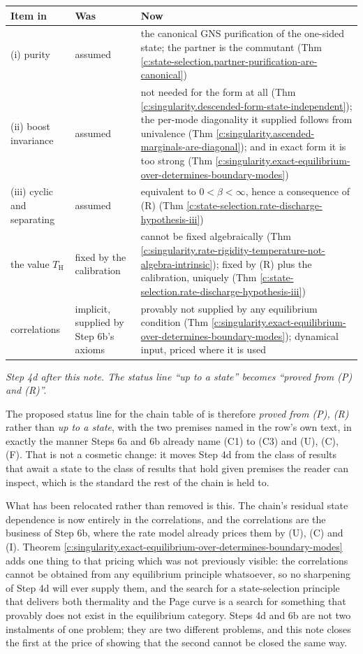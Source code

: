 \documentclass[11pt]{article}
\theoremstyle{definition}
\theoremstyle{plain}
\providecommand{\TH}{}\renewcommand{\TH}{T_{\mathrm{H}}}
\begin{document}
 \begin{tabular}{l>{ \arraybackslash}p{4.9cm}>{ \arraybackslash}p{6.3cm}}
\toprule
Item in \cite[Thm.~7.3]{ButlerT5} & Was & Now \\
\midrule
(i) purity & assumed & the canonical GNS purification of the one-sided state; the partner is the commutant (Thm \ref{c:state-selection.partner-purification-are-canonical}) \\
(ii) boost invariance & assumed & not needed for the form at all (Thm \ref{c:singularity.descended-form-state-independent}); the per-mode diagonality it supplied follows from univalence (Thm \ref{c:singularity.ascended-marginals-are-diagonal}); and in exact form it is too strong (Thm \ref{c:singularity.exact-equilibrium-over-determines-boundary-modes}) \\
(iii) cyclic and separating & assumed & equivalent to $0 < \beta < \infty$, hence a consequence of (R) (Thm \ref{c:state-selection.rate-discharge-hypothesis-iii}) \\
the value $\TH$ & fixed by the calibration & cannot be fixed algebraically (Thm \ref{c:singularity.rate-rigidity-temperature-not-algebra-intrinsic}); fixed by (R) plus the calibration, uniquely (Thm \ref{c:state-selection.rate-discharge-hypothesis-iii}) \\
correlations & implicit, supplied by Step 6b's axioms & provably not supplied by any equilibrium condition (Thm \ref{c:singularity.exact-equilibrium-over-determines-boundary-modes}); dynamical input, priced where it is used \\
\bottomrule
\end{tabular}

\emph{Step 4d after this note. The status line ``up to a state'' becomes ``proved from (P) and (R)''.}

The proposed status line for the chain table of \cite[Table 1]{ButlerT5} is therefore \emph{proved from (P), (R)} rather than \emph{up to a state}, with the two premises named in the row's own text, in exactly the manner Steps 6a and 6b already name (C1) to (C3) and (U), (C), (F). That is not a cosmetic change: it moves Step 4d from the class of results that await a state to the class of results that hold given premises the reader can inspect, which is the standard the rest of the chain is held to.

What has been relocated rather than removed is this. The chain's residual state dependence is now entirely in the correlations, and the correlations are the business of Step 6b, where the rate model already prices them by (U), (C) and (I). Theorem \ref{c:singularity.exact-equilibrium-over-determines-boundary-modes} adds one thing to that pricing which was not previously visible: the correlations cannot be obtained from any equilibrium principle whatsoever, so no sharpening of Step 4d will ever supply them, and the search for a state-selection principle that delivers both thermality and the Page curve is a search for something that provably does not exist in the equilibrium category. Steps 4d and 6b are not two instalments of one problem; they are two different problems, and this note closes the first at the price of showing that the second cannot be closed the same way.
\end{document}

